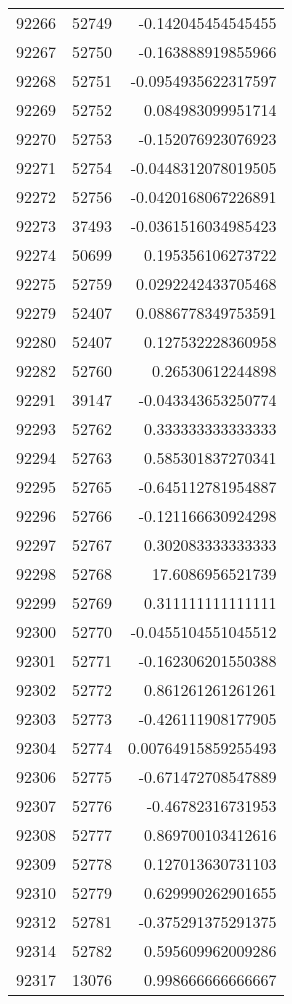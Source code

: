 \begin{tabular}{r | r | r}
92266 & 52749 & -0.142045454545455 \\
92267 & 52750 & -0.163888919855966 \\
92268 & 52751 & -0.0954935622317597 \\
92269 & 52752 & 0.084983099951714 \\
92270 & 52753 & -0.152076923076923 \\
92271 & 52754 & -0.0448312078019505 \\
92272 & 52756 & -0.0420168067226891 \\
92273 & 37493 & -0.0361516034985423 \\
92274 & 50699 & 0.195356106273722 \\
92275 & 52759 & 0.0292242433705468 \\
92279 & 52407 & 0.0886778349753591 \\
92280 & 52407 & 0.127532228360958 \\
92282 & 52760 & 0.26530612244898 \\
92291 & 39147 & -0.043343653250774 \\
92293 & 52762 & 0.333333333333333 \\
92294 & 52763 & 0.585301837270341 \\
92295 & 52765 & -0.645112781954887 \\
92296 & 52766 & -0.121166630924298 \\
92297 & 52767 & 0.302083333333333 \\
92298 & 52768 & 17.6086956521739 \\
92299 & 52769 & 0.311111111111111 \\
92300 & 52770 & -0.0455104551045512 \\
92301 & 52771 & -0.162306201550388 \\
92302 & 52772 & 0.861261261261261 \\
92303 & 52773 & -0.426111908177905 \\
92304 & 52774 & 0.00764915859255493 \\
92306 & 52775 & -0.671472708547889 \\
92307 & 52776 & -0.46782316731953 \\
92308 & 52777 & 0.869700103412616 \\
92309 & 52778 & 0.127013630731103 \\
92310 & 52779 & 0.629990262901655 \\
92312 & 52781 & -0.375291375291375 \\
92314 & 52782 & 0.595609962009286 \\
92317 & 13076 & 0.998666666666667 \\

\end{tabular}
